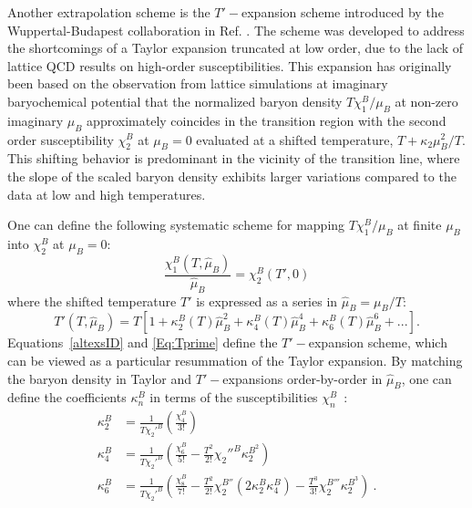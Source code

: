 \documentclass[%
 reprint,
nofootinbib,
 amsmath,amssymb,
 aps,
prc
]{revtex4-2}
\begin{document}
Another extrapolation scheme is the $T'-$expansion scheme introduced by the Wuppertal-Budapest collaboration in Ref. \cite{Borsanyi:2021sxv}.
The scheme was developed to address the shortcomings of a Taylor expansion truncated at low order, due to the lack of lattice QCD results on high-order susceptibilities.
This expansion has originally been based on the observation from lattice simulations at imaginary baryochemical potential that the normalized baryon density $T \chi_1^B/\mu_B$ at non-zero imaginary $\mu_B$ approximately coincides in the transition region with the second order susceptibility $\chi_2^B$ at $\mu_B = 0$ evaluated at a shifted temperature, $T + \kappa_2 \mu_B^2 / T$.
This shifting behavior is predominant in the vicinity of the transition line, where the slope of the scaled baryon density exhibits larger variations compared to the data at low and high temperatures. 

One can define the following systematic scheme for mapping $T \chi_1^B/\mu_B$ at finite $\mu_B$ into $\chi_2^B$ at $\mu_B = 0$:
%
\begin{equation}
\frac{\chi_1^B(T,\hat{\mu}_B)}{\hat{\mu}_B} = \chi_2^B(T',0) \label{altexsID}
\end{equation}
where the shifted temperature $T'$ is expressed as a series in $\hat{\mu}_B = \mu_B/T$:
\begin{equation}
    T'(T,\hat{\mu}_B) = T\left[1+ \kappa_2^B(T)\hat{\mu}_B^2 + \kappa_4^B(T)\hat{\mu}_B^4 + \kappa_6^B(T)\hat{\mu}_B^6 + ...\right]. 
    \label{Eq:Tprime}
\end{equation}
Equations~\eqref{altexsID} and \eqref{Eq:Tprime} define the $T'-$expansion scheme, which can be viewed as a particular resummation of the Taylor expansion.
By matching the baryon density in Taylor and $T'-$expansions order-by-order in $\hat{\mu}_B$, one can define the coefficients $\kappa_n^B$ in terms of the susceptibilities $\chi_n^B$~\cite{Borsanyi:2021sxv}:
\begin{align} \nonumber
    \kappa_2^{B} &= \frac{1}{T\chi_2'^B} \left(\frac{\chi_4^B}{3!}\right) \\ \nonumber
    \kappa_4^{B} &= \frac{1}{T\chi_2'^{B}}\left(\frac{\chi_6^B}{5!} - \frac{T^2}{2!}\chi_2''^B\kappa_2^{B^2}\right)  \\
    \kappa_6^{B} &= \frac{1}{T\chi_2'^{B}}\left(\frac{\chi_8^B}{7!} - \frac{T^2}{2!}\chi_2^{B''}(2\kappa_2^{B}\kappa_4^{B}) - \frac{T^3}{3!}\chi_2^{B'''}\kappa_2^{B^3}\right) ~.
    \label{Eqkappas}
\end{align}
\end{document}
